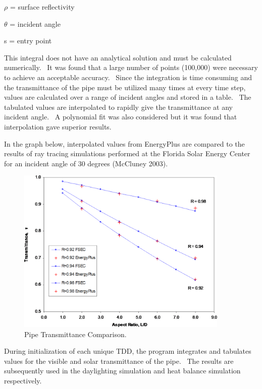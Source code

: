 \(\rho\) = surface reflectivity

\(\theta\) = incident angle

s = entry point

This integral does not have an analytical solution and must be calculated numerically.~ It was found that a large number of points (100,000) were necessary to achieve an acceptable accuracy.~ Since the integration is time consuming and the transmittance of the pipe must be utilized many times at every time step, values are calculated over a range of incident angles and stored in a table.~ The tabulated values are interpolated to rapidly give the transmittance at any incident angle.~ A polynomial fit was also considered but it was found that interpolation gave superior results.

In the graph below, interpolated values from EnergyPlus are compared to the results of ray tracing simulations performed at the Florida Solar Energy Center for an incident angle of 30 degrees (McCluney 2003).

\begin{figure}[hbtp] %
\centering
\includegraphics[width=0.9\textwidth, height=0.9\textheight, keepaspectratio=true]{media/image874.png}
\caption{Pipe Transmittance Comparison. \protect \label{fig:pipe-transmittance-comparison.}}
\end{figure}

During initialization of each unique TDD, the program integrates and tabulates values for the visible and solar transmittance of the pipe.~ The results are subsequently used in the daylighting simulation and heat balance simulation respectively.


